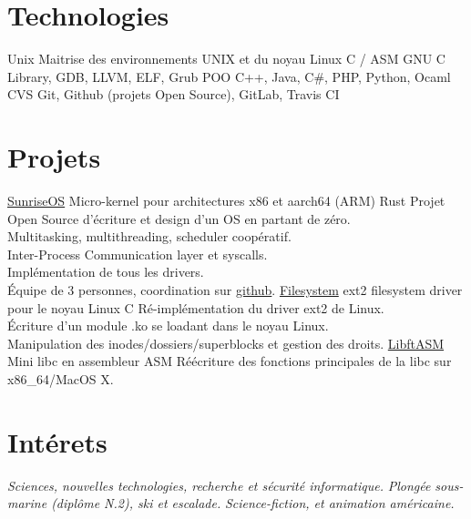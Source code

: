 \documentclass[]{twentysecondcv}
\begin{document}
\section{Technologies}

\begin{twentyshort}
  \twentyitemshortright
    {Unix}
    {Maitrise des environnements UNIX et du noyau Linux}
  \twentyitemshortright
    {C / ASM}
    {GNU C Library, GDB, LLVM, ELF, Grub}
  \twentyitemshortright
    {POO}
    {C++, Java, C\#, PHP, Python, Ocaml}
  \twentyitemshortright
    {CVS}
    {Git, Github (projets Open Source), GitLab, Travis CI}
\end{twentyshort}


\section{Projets}

\begin{twenty}
  \twentyitem
    {\href{https://github.com/roblabla42/KFS/releases}{\textcolor{cerulean}{SunriseOS}}}
    {Micro-kernel pour architectures x86 et aarch64 (ARM)}
    {Rust}
    {
		Projet Open Source d'écriture et design d'un OS en partant de zéro. \\
		Multitasking, multithreading, scheduler coopératif. \\
		Inter-Process Communication layer et syscalls. \\
		Implémentation de tous les drivers. \\
		Équipe de 3 personnes, coordination sur \href{https://github.com/roblabla42/KFS/releases}{\textcolor{cerulean}{github}}.
	}
  \twentyitem
    {\href{https://github.com/orycterope/filesystem}{\textcolor{cerulean}{Filesystem}}}
    {ext2 filesystem driver pour le noyau Linux}
    {C}
    {
		Ré-implémentation du driver ext2 de Linux. \\
		Écriture d'un module .ko se loadant dans le noyau Linux. \\
		Manipulation des inodes/dossiers/superblocks et gestion des droits.
	}
\twentyitem
    {\href{https://github.com/orycterope/libftasm}{\textcolor{cerulean}{LibftASM}}}
    {Mini libc en assembleur}
    {ASM}
    {
		Réécriture des fonctions principales de la libc sur x86\_64/MacOS X.
	}
\end{twenty}

\section{Intérets}

\begin{twentyshort}
  \twentyitemshortright
    {\textsc{\icon{\faFlask}}}
    {\emph{Sciences, nouvelles technologies, recherche et sécurité informatique.}}
  \twentyitemshortright
    {\textsc{\icon{\faFutbolO}}}
    {\emph{Plongée sous-marine (diplôme N.2), ski et escalade.}}
  \twentyitemshortright
    {\textsc{\icon{\faFilm}}}
    {\emph{Science-fiction, et animation américaine.}}
\end{twentyshort}

\end{document}
